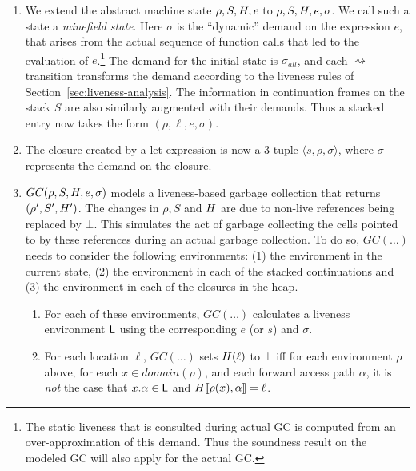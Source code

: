 \documentclass[9pt,preprint,nonatbib]{sigplanconf}
\newcommand{\added}[1]{#1}
\begin{document}
\begin{enumerate}

\item  We  extend  the  abstract  machine  state  $\rho,S,H,e$  to
  $\rho,S,H,e,\sigma$.   We call  such a  state a  \emph{minefield
  state}.  Here $\sigma$  is the ``dynamic'' demand  on the expression
  $e$, that arises from the actual sequence of function calls that led
  to  the  evaluation of  $e$.\footnote{The  static  liveness that  is
    consulted during actual GC  is computed from an over-approximation
    of this demand.  Thus the soundness  result on the modeled GC will
    also apply for the actual GC.} The demand for the initial state is
  $\sigma_{\mathit  {all}}$,  and each  $\rightsquigarrow$  transition
  transforms   the  demand   according  to   the  liveness   rules  of
  Section~\ref{sec:liveness-analysis}.      The     information     in
  continuation frames  on the stack  $S$ are also  similarly augmented
  with their demands.  Thus a stacked entry now takes the form $(\rho,
  \ell, e, \sigma)$.

\item The closure created by a let expression is now a 3-tuple
  $\langle s,  \rho, \sigma \rangle$, where $\sigma$ represents the
  demand on the closure. 

\item  $GC(\rho,  S,  H,  e, \sigma)$ models  a  liveness-based  garbage
  collection that returns $(\rho', S', H')$. The changes in
  $\rho, S$ and  $H$ are due
  to non-live references being replaced by $\bot$.  This simulates the
  act of  garbage collecting  the cells
  pointed to by these references  during an actual garbage collection.
  To do so, $GC(\ldots)$ needs to consider the following environments:  (1) the  environment in  the
  current state, (2) the  environment in each of the stacked  continuations and (3)
  the environment  in each of  the closures in  the heap.
  
 \begin{enumerate} 
\added{

 \item \label{env}  For each of  these environments, $GC(\ldots)$  calculates a
   liveness  environment $\mathsf{L}$  using  the  corresponding  $e$  (or  $s$)  and
   $\sigma$.
 \item 
   For each
    location $\ell$,  $GC(\ldots)$  sets $H(\ell)$  to $\bot$ iff for each
    environment $\rho$ above, for each $x \in domain(\rho)$, and each forward
    access
    path $\alpha$, it is \emph{not} the case that $x.\alpha \in \mathsf{L}$ and $H\llbracket\rho(x), \alpha
    \rrbracket = \ell$. 
}


\end{enumerate}
\end{enumerate}
\end{document}
